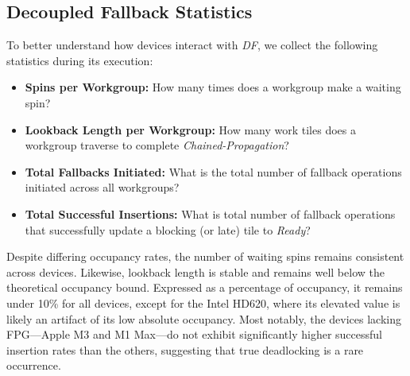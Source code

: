 \documentclass[sigconf]{acmart}
\begin{document}
\subsection{Decoupled Fallback Statistics}
To better understand how devices interact with \emph{DF}, we collect the following statistics during its execution:
\begin{itemize}
  \item \textbf{Spins per Workgroup:} How many times does a workgroup make a waiting spin?
  \item \textbf{Lookback Length per Workgroup:} How many work tiles does a workgroup traverse to complete \emph{Chained-Propagation}?
  \item \textbf{Total Fallbacks Initiated:} What is the total number of fallback operations initiated across all workgroups?
  \item \textbf{Total Successful Insertions:} What is total number of fallback operations that successfully update a blocking (or late) tile to \emph{Ready}?
\end{itemize}
Despite differing occupancy rates, the number of waiting spins remains consistent across devices. Likewise, lookback length is stable and remains well below the theoretical occupancy bound. Expressed as a percentage of occupancy, it remains under 10\% for all devices, except for the Intel HD620, where its elevated value is likely an artifact of its low absolute occupancy. Most notably, the devices lacking FPG---Apple M3 and M1 Max---do not exhibit significantly higher successful insertion rates than the others, suggesting that true deadlocking is a rare occurrence.
\end{document}
